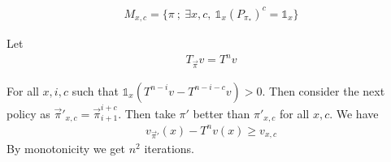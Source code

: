 \documentclass{article}
\def\1{{\mathds 1}}
\begin{document}
\begin{align}
M_{x,c} = \{ \pi ~;~ \exists x,c,~ \1_x (P_{\pi_*})^c=\1_x \}
\end{align}

Let
\begin{align}
  T_{\vec\pi}v = T^n v
\end{align}

For all $x,i,c$ such that $\1_x (T^{n-i}v - T^{n-i-c}v)>0$.
Then consider the next policy as $\vec\pi'_{x,c}=\vec\pi_{i+1}^{i+c}$.
Then take $\pi'$ better than $\pi'_{x,c}$ for all $x,c$.
We have
\begin{align}
  v_{\vec\pi'}(x)-T^nv(x) \ge v_{x,c}
\end{align}
By monotonicity we get $n^2$ iterations.
  


\end{document}
